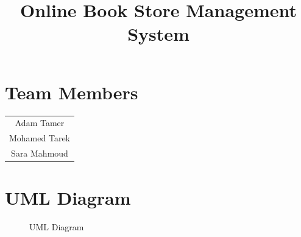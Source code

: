 \documentclass[a4paper,14pt]{extarticle}
\title{Online Book Store Management System}
\author{}
\date{}
\begin{document}
\maketitle

\section*{\centering Team Members}
\begin{center}
    \begin{tabular}{c}
        Adam Tamer \\
        Mohamed Tarek \\
        Sara Mahmoud
    \end{tabular}
\end{center}

\section*{UML Diagram}

\begin{figure}[H]
    \centering
    \caption{UML Diagram}
\end{figure}


\newpage
\end{document}
